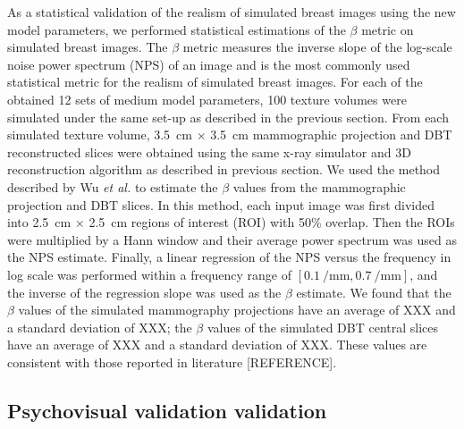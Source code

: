\documentclass[journal]{IEEEtran}
\begin{document}
As a statistical validation of the realism of simulated breast images
using the new model parameters, we performed statistical estimations
of the $\beta$ metric on simulated breast images. The $\beta$ metric
measures the inverse slope of the log-scale noise power spectrum (NPS)
of an image and is the most commonly used statistical metric for the
realism of simulated breast images. For each of the obtained 12 sets
of medium model parameters, 100 texture volumes were simulated under
the same set-up as described in the previous section. From each
simulated texture volume, \SI{3.5}{\cm} $\times$ \SI{3.5}{\cm}
mammographic projection and DBT reconstructed slices were obtained
using the same x-ray simulator and 3D reconstruction algorithm as
described in previous section. We used the method described by Wu
\textit{et al.} \cite{wu2012spectral} to estimate the $\beta$ values
from the mammographic projection and DBT slices. In this method, each
input image was first divided into \SI{2.5}{\cm} $\times$
\SI{2.5}{\cm} regions of interest (ROI) with 50\% overlap. Then the
ROIs were multiplied by a Hann window and their average power spectrum
was used as the NPS estimate. Finally, a linear regression of the NPS
versus the frequency in log scale was performed within a frequency
range of $\left[ \SI{0.1}{\per\mm}, \SI{0.7}{\per\mm} \right]$, and
the inverse of the regression slope was used as the $\beta$
estimate. We found that the $\beta$ values of the simulated
mammography projections have an average of XXX and a standard
deviation of XXX; the $\beta$ values of the simulated DBT central
slices have an average of XXX and a standard deviation of XXX. These
values are consistent with those reported in literature [REFERENCE].

\subsection{Psychovisual validation validation}
\label{sec:psych-valid-valid}
\end{document}
